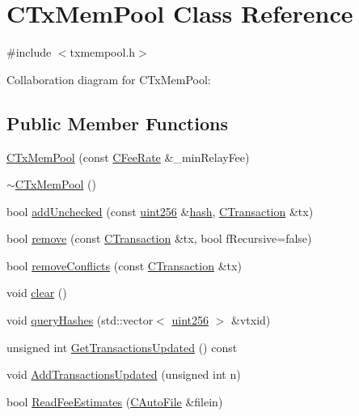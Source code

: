 \hypertarget{class_c_tx_mem_pool}{}\section{C\+Tx\+Mem\+Pool Class Reference}
\label{class_c_tx_mem_pool}


{\ttfamily \#include $<$txmempool.\+h$>$}



Collaboration diagram for C\+Tx\+Mem\+Pool\+:
\subsection*{Public Member Functions}
\begin{DoxyCompactItemize}
\item 
\hyperlink{class_c_tx_mem_pool_a82147548cfa962975690d1926b717c1c}{C\+Tx\+Mem\+Pool} (const \hyperlink{class_c_fee_rate}{C\+Fee\+Rate} \&\+\_\+min\+Relay\+Fee)
\item 
\hyperlink{class_c_tx_mem_pool_a038108efea0c4312e5bed2ce064702b2}{$\sim$\+C\+Tx\+Mem\+Pool} ()
\item 
bool \hyperlink{class_c_tx_mem_pool_a1203ac5cf3bdb88af4922705afad555d}{add\+Unchecked} (const \hyperlink{classuint256}{uint256} \&\hyperlink{cache_8cc_a11ecb029164e055f28f4123ce3748862}{hash}, \hyperlink{class_c_transaction}{C\+Transaction} \&tx)
\item 
bool \hyperlink{class_c_tx_mem_pool_a258e23e3a434045d522a8cebc5a039ce}{remove} (const \hyperlink{class_c_transaction}{C\+Transaction} \&tx, bool f\+Recursive=false)
\item 
bool \hyperlink{class_c_tx_mem_pool_ab6f7c0b3ddb8383767d97d22103ffd9b}{remove\+Conflicts} (const \hyperlink{class_c_transaction}{C\+Transaction} \&tx)
\item 
void \hyperlink{class_c_tx_mem_pool_a6dba6bce4139392751321438a29b6b09}{clear} ()
\item 
void \hyperlink{class_c_tx_mem_pool_a42fa7d41a45562d02e356f2e7708bb02}{query\+Hashes} (std\+::vector$<$ \hyperlink{classuint256}{uint256} $>$ \&vtxid)
\item 
unsigned int \hyperlink{class_c_tx_mem_pool_a26a5bdb66c9b84f73d1d30fea8e31cc9}{Get\+Transactions\+Updated} () const 
\item 
void \hyperlink{class_c_tx_mem_pool_a3039b67e5eebaa3ff830261c192816f2}{Add\+Transactions\+Updated} (unsigned int n)
\item 
bool \hyperlink{class_c_tx_mem_pool_a0dbbcb6a3b7e1a6c564410668c12cd4f}{Read\+Fee\+Estimates} (\hyperlink{class_c_auto_file}{C\+Auto\+File} \&filein)

\end{DoxyCompactItemize}
